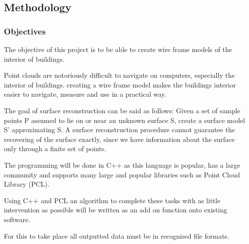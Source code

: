 
\subsection{Methodology}

\subsubsection{Objectives}

The objective of this project is to be able to create wire frame models of the interior of buildings.

Point clouds are notoriously difficult to navigate on computers, especially the interior of buildings. creating a wire frame model makes the buildings interior easier to navigate, measure and use in a practical way.

The goal of surface reconstruction can be said as follows: Given a set of sample points P assumed to lie on or near an unknown surface S, create a surface model S' approximating S.
A surface reconstruction procedure cannot guarantee the recovering of the surface exactly, since we have information about the surface only through a finite set of points.

The programming will be done in C++ as this language is popular, has a large community and supports many large and popular libraries such as Point Cloud Library (PCL). 

Using C++ and PCL an algorithm to complete these tasks with as little intervention as possible will be written as an add on function onto existing software.

For this to take place all outputted data must be in recognised file formats.


